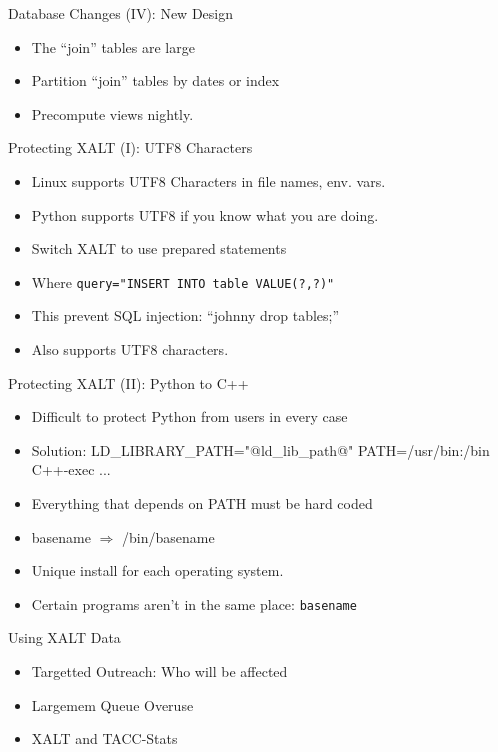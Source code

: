 \documentclass{beamer}
\begin{document}
\begin{frame}{Database Changes (IV): New Design}
  \begin{itemize}
    \item The ``join'' tables are large 
    \item Partition ``join'' tables by dates or index
    \item Precompute views nightly.
  \end{itemize}
\end{frame}

\begin{frame}{Protecting XALT (I): UTF8 Characters}
  \begin{itemize}
    \item Linux supports UTF8 Characters in file names, env. vars.
    \item Python supports UTF8 if you know what you are doing.
    \item Switch XALT to use prepared statements
    \item Where \texttt{query="INSERT INTO table VALUE(?,?)"}
    \item This prevent SQL injection: ``johnny drop tables;''
    \item Also supports UTF8 characters.
  \end{itemize}
\end{frame}

\begin{frame}{Protecting XALT (II): Python to C++}
    \begin{itemize}
      \item Difficult to protect Python from users in every case
      \item Solution: LD\_LIBRARY\_PATH="@ld\_lib\_path@"
        PATH=/usr/bin:/bin C++-exec ...
      \item Everything that depends on PATH must be hard coded
      \item basename $\Rightarrow$ /bin/basename
      \item Unique install for each operating system.
      \item Certain programs aren't in the same place: \texttt{basename}
    \end{itemize}
\end{frame}

\begin{frame}{Using XALT Data}
  \begin{itemize}
    \item Targetted Outreach: Who will be affected
    \item Largemem Queue Overuse
    \item XALT and TACC-Stats
  \end{itemize}
\end{frame}
\end{document}
